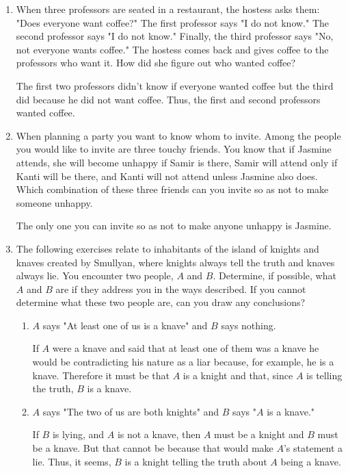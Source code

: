 \documentclass[11pt]{article}
\begin{document}
\begin{enumerate}[label=\textbf{\arabic*.}]
	\item When three professors are seated in a restaurant, the hostess asks them: "Does everyone want coffee?" The first professor says "I do not know." The second professor says "I do not know." Finally, the third professor says "No, not everyone wants coffee." The hostess comes back and gives coffee to the professors who want it. How did she figure out who wanted coffee?
	
	The first two professors didn't know if everyone wanted coffee but the third did because he did not want coffee. Thus, the first and second professors wanted coffee.
	
	\item When planning a party you want to know whom to invite. Among the people you would like to invite are three touchy friends. You know that if Jasmine attends, she will become unhappy if Samir is there, Samir will attend only if Kanti will be there, and Kanti will not attend unless Jasmine also does. Which combination of these three friends can you invite so as not to make someone unhappy.
	
	The only one you can invite so as not to make anyone unhappy is Jasmine.
	
	\item The following exercises relate to inhabitants of the island of knights and knaves created by Smullyan, where knights always tell the truth and knaves always lie. You encounter two people, $A$ and $B$. Determine, if possible, what $A$ and $B$ are if they address you in the ways described. If you cannot determine what these two people are, can you draw any conclusions?
	\begin{enumerate}[label=\textbf{\alph*)}]
		\item $A$ says "At least one of us is a knave" and $B$ says nothing.
		
		If $A$ were a knave and said that at least one of them was a knave he would be contradicting his nature as a liar because, for example, he is a knave. Therefore it must be that $A$ is a knight and that, since $A$ is telling the truth, $B$ is a knave.
		
		\item $A$ says "The two of us are both knights" and $B$ says "$A$ is a knave."
		
		If $B$ is lying, and $A$ is not a knave, then $A$ must be a knight and $B$ must be a knave. But that cannot be because that would make $A$'s statement a lie. Thus, it seems, $B$ is a knight telling the truth about $A$ being a knave.
		

\end{enumerate}
\end{enumerate}
\end{document}
